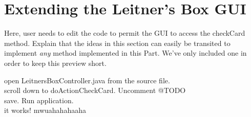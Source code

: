\newpage
\section{Extending the Leitner's Box GUI}
\genHeader

Here, user needs to edit the code to permit the GUI to access the checkCard method. Explain that the ideas in this section can easily be transited to implement
\emph{any} method implemented in this Part. We've only included one in order to keep this preview short.

open LeitnersBoxController.java from the source file. \\

scroll down to doActionCheckCard. Uncomment @TODO \\

save. Run application.\\

it works! mwuahahahaaha
